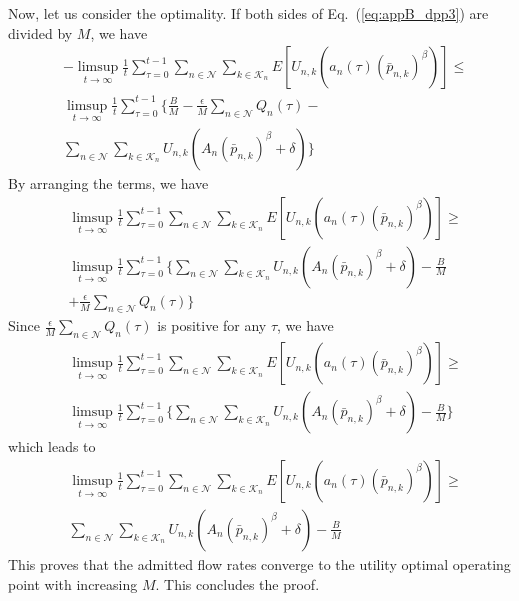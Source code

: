 \documentclass[conference]{IEEEtran}
\newcommand{\Kset}{\mathcal{K}}
\newcommand{\Nset}{\mathcal{N}}
\begin{document}
Now, let us consider the optimality. If both sides of Eq.~(\ref{eq:appB_dpp3}) are divided by $M$, we have
\begin{align}
& - \limsup_{t \rightarrow \infty}  \frac{1}{t} \sum_{\tau = 0}^{t-1}  \sum_{n \in \Nset} \sum_{k \in \Kset_{n}} E[U_{n,k} (a_{n}(\tau) (\bar{p}_{n,k})^{\beta} ) ] \leq  \nonumber \\
& \limsup_{t \rightarrow \infty}  \frac{1}{t} \sum_{\tau = 0}^{t-1}  \bigl \{ \frac{B}{M} - \frac{\epsilon}{M} \sum_{n \in \Nset} Q_{n}(\tau) - \nonumber \\
& \sum_{n \in \Nset} \sum_{k \in \Kset_{n}}  U_{n,k} (A_n(\bar{p}_{n,k})^{\beta} + \delta)  \bigr \}
\end{align} By arranging the terms, we have 
\begin{align}
& \limsup_{t \rightarrow \infty}  \frac{1}{t} \sum_{\tau = 0}^{t-1}  \sum_{n \in \Nset} \sum_{k \in \Kset_{n}} E[U_{n,k} (a_{n}(\tau) (\bar{p}_{n,k})^{\beta} ) ] \geq  \nonumber \\
& \limsup_{t \rightarrow \infty}  \frac{1}{t} \sum_{\tau = 0}^{t-1}  \bigl \{  \sum_{n \in \Nset} \sum_{k \in \Kset_{n}}  U_{n,k} (A_n(\bar{p}_{n,k})^{\beta} + \delta) - \frac{B}{M} \nonumber \\
& + \frac{\epsilon}{M} \sum_{n \in \Nset} Q_{n}(\tau)  \bigr \}
\end{align} Since $\frac{\epsilon}{M} \sum_{n \in \Nset} Q_{n}(\tau)$ is positive for any $\tau$, we have
\begin{align}
& \limsup_{t \rightarrow \infty}  \frac{1}{t} \sum_{\tau = 0}^{t-1}  \sum_{n \in \Nset} \sum_{k \in \Kset_{n}} E[U_{n,k} (a_{n}(\tau) (\bar{p}_{n,k})^{\beta} ) ] \geq  \nonumber \\
& \limsup_{t \rightarrow \infty}  \frac{1}{t} \sum_{\tau = 0}^{t-1}  \bigl \{  \sum_{n \in \Nset} \sum_{k \in \Kset_{n}}  U_{n,k} (A_n(\bar{p}_{n,k})^{\beta} + \delta) - \frac{B}{M}   \bigr \}
\end{align} which leads to
\begin{align}
& \limsup_{t \rightarrow \infty}  \frac{1}{t} \sum_{\tau = 0}^{t-1}  \sum_{n \in \Nset} \sum_{k \in \Kset_{n}} E[U_{n,k} (a_{n}(\tau) (\bar{p}_{n,k})^{\beta} ) ] \geq  \nonumber \\
& \sum_{n \in \Nset} \sum_{k \in \Kset_{n}}  U_{n,k} (A_n(\bar{p}_{n,k})^{\beta} + \delta) - \frac{B}{M} 
\end{align} This proves that the admitted flow rates converge to the utility optimal operating point with increasing $M$. This concludes the proof. 
\end{document}
